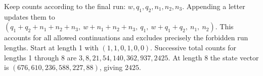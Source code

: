Keep counts according to the final run: $w,q_1,q_2,n_1,n_2,n_3$. Appending a letter updates them to $(q_1+q_2+n_1+n_2+n_3,\ w+n_1+n_2+n_3,\ q_1,\ w+q_1+q_2,\ n_1,\ n_2)$. This accounts for all allowed continuations and excludes precisely the forbidden run lengths. Start at length 1 with $(1,1,0,1,0,0)$. Successive total counts for lengths 1 through 8 are $3,8,21,54,140,362,937,2425$. At length 8 the state vector is $(676,610,236,588,227,88)$, giving $\boxed{2425}$.

